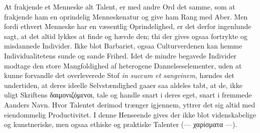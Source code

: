 \documentclass[12pt]{book}
\newcommand{\opage}[1]{\marginnote{\footnotesize\textit{[#1]}}}
\begin{document}
At frakjende et Menneske alt Talent, er med andre Ord det samme, som at frakjende
ham en oprindelig Menneskenatur og give ham Rang med Aber. Men fordi ethvert
Menneske har en væsentlig Oprindelighed, er det derfor ingenlunde sagt, at det
altid lykkes at finde og hævde den; thi der gives ogsaa fortrykte og misdannede
Individer. Ikke blot Barbariet, ogsaa Culturverdenen kan hemme Individualitetens
sunde og sande Frihed. Idet de mindre begavede Individer modtage
\opage{272} den store Mangfoldighed af heterogene Dannelseselementer, uden at kunne forvandle
det overleverede Stof \textit{in succum et sangvinem}, hændes det undertiden, at
deres ideelle Selvstændighed gaaer saa aldeles tabt, at de, ikke uligt Skriftens
δαιμονιζόμενοι, tale og handle snart i deres eget, snart i fremmede Aanders Navn.
Hvor Talentet derimod trænger igjennem, yttrer det sig altid med eiendommelig
Productivitet. I denne Henseende gives der ikke blot videnskabelige og
kunstneriske, men ogsaa ethiske og praktiske Talenter (--- χαρίσματα ---).
\end{document}
